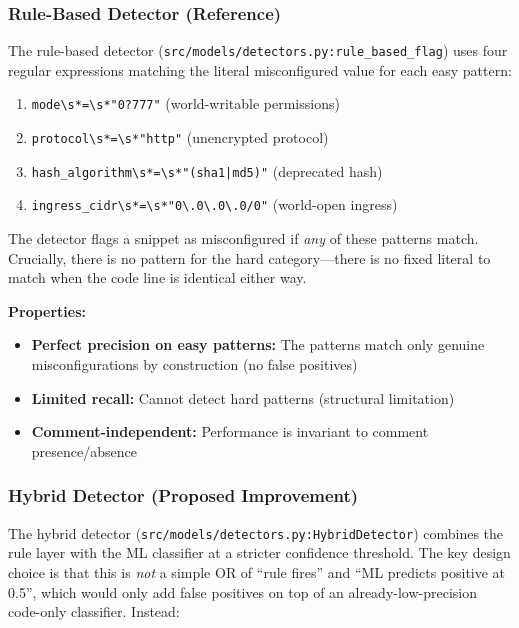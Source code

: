 \subsubsection{Rule-Based Detector (Reference)}

The rule-based detector (\texttt{src/models/detectors.py:rule\_based\_flag}) uses four regular expressions matching the literal misconfigured value for each easy pattern:
\begin{enumerate}
  \item \texttt{mode\textbackslash{}s*=\textbackslash{}s*"0?777"} (world-writable permissions)
  \item \texttt{protocol\textbackslash{}s*=\textbackslash{}s*"http"} (unencrypted protocol)
  \item \texttt{hash\_algorithm\textbackslash{}s*=\textbackslash{}s*"(sha1|md5)"} (deprecated hash)
  \item \texttt{ingress\_cidr\textbackslash{}s*=\textbackslash{}s*"0\textbackslash{}.0\textbackslash{}.0\textbackslash{}.0/0"} (world-open ingress)
\end{enumerate}

The detector flags a snippet as misconfigured if \emph{any} of these patterns match. Crucially, there is no pattern for the hard category—there is no fixed literal to match when the code line is identical either way.

\textbf{Properties:}
\begin{itemize}
  \item \textbf{Perfect precision on easy patterns:} The patterns match only genuine misconfigurations by construction (no false positives)
  \item \textbf{Limited recall:} Cannot detect hard patterns (structural limitation)
  \item \textbf{Comment-independent:} Performance is invariant to comment presence/absence
\end{itemize}

\subsubsection{Hybrid Detector (Proposed Improvement)}

The hybrid detector (\texttt{src/models/detectors.py:HybridDetector}) combines the rule layer with the ML classifier at a stricter confidence threshold. The key design choice is that this is \emph{not} a simple OR of ``rule fires'' and ``ML predicts positive at 0.5'', which would only add false positives on top of an already-low-precision code-only classifier. Instead:

